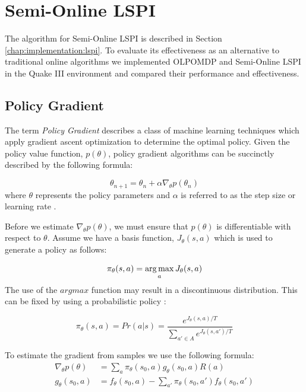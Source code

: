 \section{Semi-Online LSPI}

The algorithm for Semi-Online LSPI is described in Section \ref{chap:implementation:lspi}. To evaluate its effectiveness as an alternative to traditional online algorithms we implemented OLPOMDP and Semi-Online LSPI in the Quake III environment and compared their performance and effectiveness.

\subsection{Policy Gradient}

The term \emph{Policy Gradient} describes a class of machine learning techniques which apply gradient ascent optimization to determine the optimal policy. Given the policy value function, $p(\theta)$, policy gradient algorithms can be succinctly described by the following formula:

\[
    \theta_{n+1} = \theta_{n} + \alpha\nabla_\theta p(\theta_{n})
\]
where $\theta$ represents the policy parameters and $\alpha$ is referred to as the step size or learning rate \cite{norvig}\cite{bishop}.

Before we estimate $\nabla_\theta p(\theta)$, we must ensure that $p(\theta)$ is differentiable with respect to $\theta$. Assume we have a basis function, $J_\theta(s,a)$ which is used to generate a policy as follows:

\[
    \pi_\theta(s,a) = \operatorname*{arg\,max}_a J_\theta(s,a)
\]
The use of the $argmax$ function may result in a discontinuous distribution. This can be fixed by using a probabilistic policy \cite{olpomdp:lecture}:

\begin{equation}
\label{eq:grad:policy}
    \pi_\theta(s,a) = Pr(a|s) = \frac{e^{J_\theta(s,a)/T}}{\sum\limits_{a'\in A} e^{J_\theta(s,a')/T}}
\end{equation}

To estimate the gradient from samples we use the following formula:
\begin{equation}
\label{eq:grad}
    \begin{aligned}
        \nabla_\theta p(\theta) &= \sum_a\pi_\theta(s_0,a)g_\theta(s_0,a)R(a) \\
        g_\theta(s_0,a) &= f_\theta(s_0, a) - \sum\limits_{a'} \pi_\theta(s_0,a')f_\theta(s_0,a')
    \end{aligned}
\end{equation}

